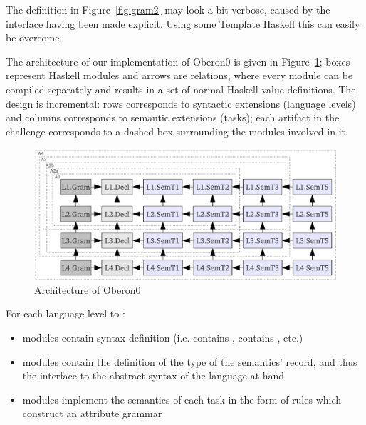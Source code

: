 The definition in Figure~\ref{fig:gram2} may look a bit verbose, caused by  the interface having been made explicit. 
Using some Template Haskell this can  easily be overcome.

The architecture of our implementation of Oberon0 is given in Figure~\ref{fig:modules};
boxes represent Haskell modules and arrows are  relations, where every module can be compiled separately and results in a set of normal Haskell value definitions. 
The design is incremental:  rows corresponds to syntactic extensions (language levels) and
 columns corresponds to semantic extensions (tasks);
each artifact in the challenge corresponds to a dashed box surrounding the modules involved in it.
\begin{figure}[th]
\begin{center}
	\includegraphics[scale=0.65]{cococo/modules.pdf}
\caption{Architecture of Oberon0}
\label{fig:modules}
\end{center}
\end{figure}
For each language level  to : 
\begin{itemize}
	\item  {} modules contain  syntax definition (i.e.  contains ,  contains , etc.)
	\item {} modules contain the definition of the type of the semantics' record, and thus the interface to the abstract syntax of the language at hand
	\item {} modules implement the semantics of each task in the form of rules which construct an attribute grammar
\end{itemize}

